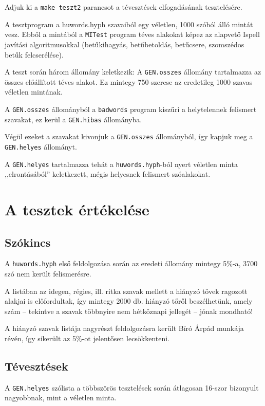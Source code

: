 Adjuk ki a  \texttt{make teszt2} parancsot a tévesztések
elfogadásának tesztelésére.

A tesztprogram a huwords.hyph szavaiból egy
véletlen, 1000 szóból álló mintát vesz.
Ebből a mintából a \texttt{MITest} program
téves alakokat képez az alapvető Ispell
javítási algoritmusokkal (betűkihagyás,
betűbetoldás, betűcsere, szomszédos betűk
felcserélése). 

A teszt során három állomány keletkezik:
A \texttt{GEN.osszes} állomány tartalmazza az összes
előállított téves alakot. Ez mintegy 750-szerese
az eredetileg 1000 szavas véletlen mintának.

A \texttt{GEN.osszes} állományból a \texttt{badwords}
program kiszűri a helytelennek felismert szavakat,
ez kerül a \texttt{GEN.hibas} állományba.

Végül ezeket a szavakat kivonjuk a \texttt{GEN.osszes} állományból,
így kapjuk meg a \texttt{GEN.helyes} állományt.

A \texttt{GEN.helyes} tartalmazza tehát 
a \texttt{huwords.hyph}-ból nyert véletlen minta ,,elrontásából'' keletkezett,
mégis helyesnek felismert szóalakokat.

\section{A tesztek értékelése}

\subsection{Szókincs}

A \texttt{huwords.hyph} első feldolgozása során
az eredeti állomány mintegy 5\%-a,
3700 szó nem került felismerésre.

A listában az idegen, régies, ill. ritka szavak mellett a hiányzó
tövek ragozott alakjai is előfordultak, így mintegy 2000
db. hiányzó tőről beszélhetünk, amely szám -- tekintve a
szavak többnyire nem hétköznapi jellegét -- jónak mondható!

A hiányzó szavak listája nagyrészt feldolgozásra került
Bíró Árpád munkája révén, így sikerült az 5\%-ot
jelentősen lecsökkenteni.

\subsection{Tévesztések}

A \texttt{GEN.helyes} szólista a többszörös tesztelések során átlagosan 16-szor
bizonyult nagyobbnak, mint a véletlen minta.

